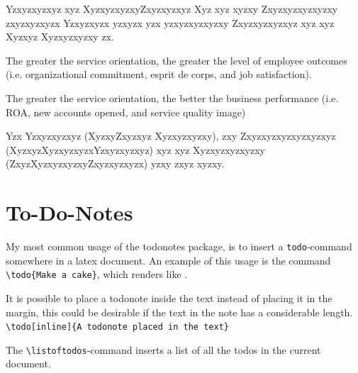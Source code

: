 Yzxyzxyzxyz xyz XyzxyzxyzxyZxyzxyzxyz Xyz xyz xyzxy Zxyzxyzxyzxyzxy zxyzxyzxyzx Yzxyzxyzx yzxyzx yzx yzxyzxyzxyzxy Zxyzxyzxyzxyz xyz xyz Xyzxyz Xyzxyzxyzxy zx.

\begin{hypothesis}
The greater the service orientation, the greater the level of employee outcomes (i.e. organizational commitment, esprit de corps, and job satisfaction).
\end{hypothesis}

\begin{hypothesis}
The greater the service orientation, the better the business performance (i.e. ROA, new accounts opened, and service quality image)
\end{hypothesis}

Yzx Yzxyzxyzxyz (XyzxyZxyzxyz Xyzxyzxyzxy), zxy Zxyzxyzxyzxyzxyzxyz (XyzxyzXyzxyzxyzxYzxyzxyzxyz) xyz xyz Xyzxyzxyzxyzxy (ZxyzXyzxyzxyzxyZxyzxyzxyzx) yzxy zxyz xyzxy.

\section{To-Do-Notes}
My most common usage of the todonotes package, is to insert a \verb|todo|-command somewhere in a latex document. An example of this usage is the command \verb|\todo{Make a cake}|, which renders like . 

It is possible to place a todonote inside the text instead of placing it in the margin, this could be desirable if the text in the note has a considerable length. \verb|\todo[inline]{A todonote placed in the text}| 

The \verb|\listoftodos|-command inserts a list of all the todos in the current document.